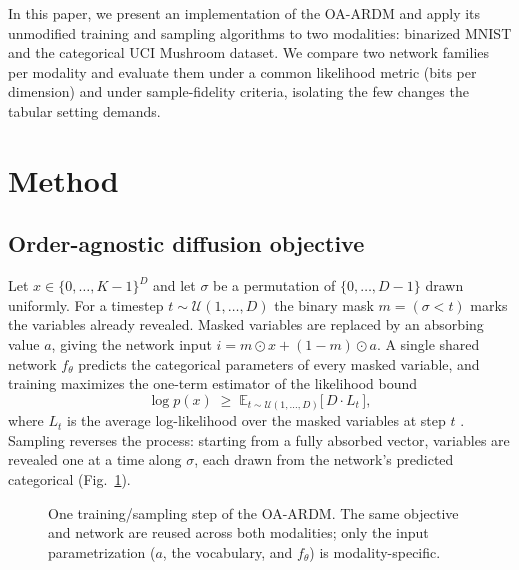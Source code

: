 \documentclass[conference]{IEEEtran}
\begin{document}
In this paper, we present an implementation of the OA-ARDM and apply its
unmodified training and sampling algorithms to two modalities: binarized MNIST
and the categorical UCI Mushroom dataset. We compare two network families per
modality and evaluate them under a common likelihood metric (bits per
dimension) and under sample-fidelity criteria, isolating the few changes the
tabular setting demands.

\section{Method}
\subsection{Order-agnostic diffusion objective}
Let $x\in\{0,\dots,K-1\}^{D}$ and let $\sigma$ be a permutation of
$\{0,\dots,D-1\}$ drawn uniformly. For a timestep $t\sim\mathcal{U}(1,\dots,D)$
the binary mask $m=(\sigma<t)$ marks the variables already revealed. Masked
variables are replaced by an absorbing value $a$, giving the network input
$i=m\odot x+(1-m)\odot a$. A single shared network $f_\theta$ predicts the
categorical parameters of every masked variable, and training maximizes the
one-term estimator of the likelihood bound
\begin{equation}
\log p(x)\;\ge\;\mathbb{E}_{t\sim\mathcal{U}(1,\dots,D)}\big[\,D\cdot L_t\,\big],
\end{equation}
where $L_t$ is the average log-likelihood over the masked variables at step
$t$ \cite{ardm}. Sampling reverses the process: starting from a fully absorbed
vector, variables are revealed one at a time along $\sigma$, each drawn from
the network's predicted categorical (Fig.~\ref{fig:schema}).

\begin{figure}[t]
\centering
{}
\caption{One training/sampling step of the OA-ARDM. The same objective and
network are reused across both modalities; only the input parametrization
($a$, the vocabulary, and $f_\theta$) is modality-specific.}
\label{fig:schema}
\end{figure}
\end{document}
